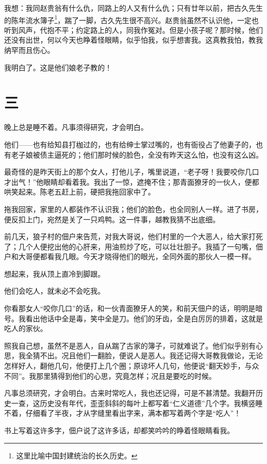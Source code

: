 \documentclass[12pt,UTF8]{ctexbook}
\begin{document}
我想：我同赵贵翁有什么仇，同路上的人又有什么仇；只有廿年以前，把古久先生的陈年流水簿子\footnote{这里比喻中国封建统治的长久历史。}，踹了一脚，古久先生很不高兴。赵贵翁虽然不认识他，一定也听到风声，代抱不平；约定路上的人，同我作冤对。但是小孩子呢？那时候，他们还没有出世，何以今天也睁着怪眼睛，似乎怕我，似乎想害我。这真教我怕，教我纳罕而且伤心。

我明白了。这是他们娘老子教的！

\section{三}

晚上总是睡不着。凡事须得研究，才会明白。

他们——也有给知县打枷过的，也有给绅士掌过嘴的，也有衙役占了他妻子的，也有老子娘被债主逼死的；他们那时候的脸色，全没有昨天这么怕，也没有这么凶。

最奇怪的是昨天街上的那个女人，打他儿子，嘴里说道，“老子呀！我要咬你几口才出气！”他眼睛却看着我。我出了一惊，遮掩不住；那青面獠牙的一伙人，便都哄笑起来。陈老五赶上前，硬把我拖回家中了。

拖我回家，家里的人都装作不认识我；他们的脸色，也全同别人一样。进了书房，便反扣上门，宛然是关了一只鸡鸭。这一件事，越教我猜不出底细。

前几天，狼子村的佃户来告荒，对我大哥说，他们村里的一个大恶人，给大家打死了；几个人便挖出他的心肝来，用油煎炒了吃，可以壮壮胆子。我插了一句嘴，佃户和大哥便都看我几眼。今天才晓得他们的眼光，全同外面的那伙人一模一样。

想起来，我从顶上直冷到脚跟。

他们会吃人，就未必不会吃我。

你看那女人“咬你几口”的话，和一伙青面獠牙人的笑，和前天佃户的话，明明是暗号。我看出他话中全是毒，笑中全是刀。他们的牙齿，全是白厉厉的排着，这就是吃人的家伙。

照我自己想，虽然不是恶人，自从踹了古家的簿子，可就难说了。他们似乎别有心思，我全猜不出。况且他们一翻脸，便说人是恶人。我还记得大哥教我做论，无论怎样好人，翻他几句，他便打上几个圈；原谅坏人几句，他便说“翻天妙手，与众不同”。我那里猜得到他们的心思，究竟怎样；况且是要吃的时候。

凡事总须研究，才会明白。古来时常吃人，我也还记得，可是不甚清楚。我翻开历史一查，这历史没有年代，歪歪斜斜的每叶上都写着“仁义道德”几个字。我横竖睡不着，仔细看了半夜，才从字缝里看出字来，满本都写着两个字是“吃人”！

书上写着这许多字，佃户说了这许多话，却都笑吟吟的睁着怪眼睛看我。
\end{document}
